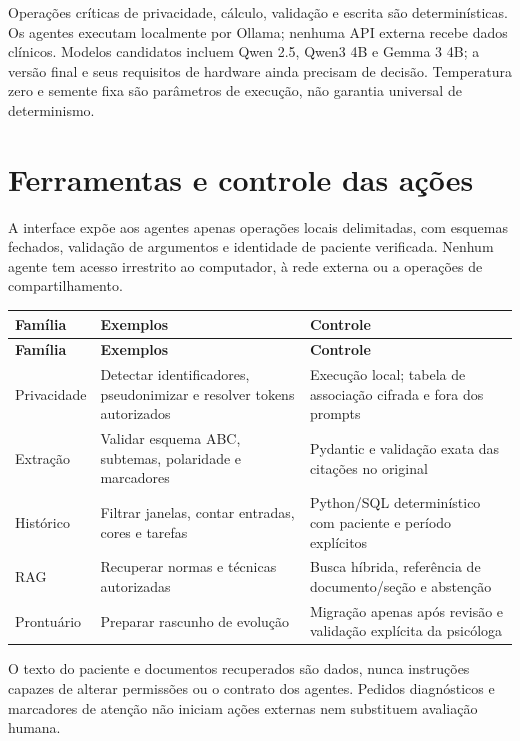 \documentclass[11pt,a4paper]{article}
\begin{document}
Operações críticas de privacidade, cálculo, validação e escrita são determinísticas. Os agentes executam localmente por Ollama; nenhuma API externa recebe dados clínicos. Modelos candidatos incluem Qwen 2.5, Qwen3 4B e Gemma 3 4B; a versão final e seus requisitos de hardware ainda precisam de decisão. Temperatura zero e semente fixa são parâmetros de execução, não garantia universal de determinismo.

\section{Ferramentas e controle das ações}
A interface expõe aos agentes apenas operações locais delimitadas, com esquemas fechados, validação de argumentos e identidade de paciente verificada. Nenhum agente tem acesso irrestrito ao computador, à rede externa ou a operações de compartilhamento.

\begingroup\small
\begin{longtable}{>{\raggedright\arraybackslash}p{}>{\raggedright\arraybackslash}p{}>{\raggedright\arraybackslash}p{}}
\toprule
\textbf{Família} & \textbf{Exemplos} & \textbf{Controle} \\ \midrule\endfirsthead
\toprule
\textbf{Família} & \textbf{Exemplos} & \textbf{Controle} \\ \midrule\endhead
\bottomrule\endfoot
Privacidade & Detectar identificadores, pseudonimizar e resolver tokens autorizados & Execução local; tabela de associação cifrada e fora dos prompts \\[3pt]
Extração & Validar esquema ABC, subtemas, polaridade e marcadores & Pydantic e validação exata das citações no original \\[3pt]
Histórico & Filtrar janelas, contar entradas, cores e tarefas & Python/SQL determinístico com paciente e período explícitos \\[3pt]
RAG & Recuperar normas e técnicas autorizadas & Busca híbrida, referência de documento/seção e abstenção \\[3pt]
Prontuário & Preparar rascunho de evolução & Migração apenas após revisão e validação explícita da psicóloga \\[3pt]
\end{longtable}
\endgroup
O texto do paciente e documentos recuperados são dados, nunca instruções capazes de alterar permissões ou o contrato dos agentes. Pedidos diagnósticos e marcadores de atenção não iniciam ações externas nem substituem avaliação humana.
\end{document}
